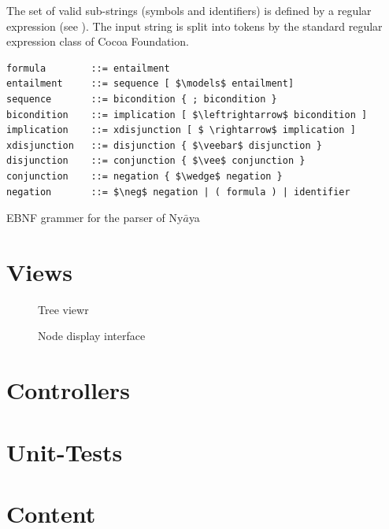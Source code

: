 The set of valid sub-strings (symbols and identifiers) is defined by a regular expression (see ). 
The input string is split into tokens by the standard regular expression class of Cocoa Foundation.

\begin{table}[htdp]
\begin{center}
\begin{lstlisting}[mathescape]
formula        ::= entailment
entailment     ::= sequence [ $\models$ entailment]
sequence       ::= bicondition { ; bicondition } 
bicondition    ::= implication [ $\leftrightarrow$ bicondition ]
implication    ::= xdisjunction [ $ \rightarrow$ implication ]
xdisjunction   ::= disjunction { $\veebar$ disjunction }
disjunction    ::= conjunction { $\vee$ conjunction }
conjunction    ::= negation { $\wedge$ negation }
negation       ::= $\neg$ negation | ( formula ) | identifier
\end{lstlisting}
\caption{EBNF grammer for the parser of Ny$\bar{a}$ya}
\label{tab:EBNF}
\end{center}
\end{table}


\section{Views}

\begin{figure}[htbp]
\begin{center}
\caption{Tree viewr}
\label{fig:TreeView}
\end{center}
\end{figure}

\begin{figure}[htbp]
\begin{center}
\caption{Node display interface}
\label{fig:NyayaNodeDisplay}
\end{center}
\end{figure}

\section{Controllers}








\section{Unit-Tests}

\section{Content}



